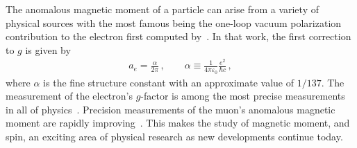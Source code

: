 The anomalous magnetic moment of a particle can arise from a variety of physical sources with the most famous being the one-loop vacuum polarization contribution to the electron first computed by~\cite{Schwinger:1951nm}. In that work, the first correction to $g$ is given by
\begin{gather}
    a_{e} = \frac{\alpha}{2\pi}\,,\qquad
    \alpha\equiv\frac{1}{4\pi\varepsilon_{0}}\frac{e^{2}}{\hbar c}\,,
\end{gather}
where $\alpha$ is the fine structure constant with an approximate value of $1/137$. The measurement of the electron's $g$-factor is among the most precise measurements in all of physics~\citep{Tiesinga:2021myr}. Precision measurements of the muon's anomalous magnetic moment are rapidly improving~\citep{Muong-2:2023cdq}. This makes the study of magnetic moment, and spin, an exciting area of physical research as new developments continue today.


